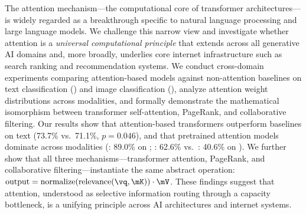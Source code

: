 The attention mechanism---the computational core of transformer architectures---is widely regarded as a breakthrough specific to natural language processing and large language models. We challenge this narrow view and investigate whether attention is a \emph{universal computational principle} that extends across all generative AI domains and, more broadly, underlies core internet infrastructure such as search ranking and recommendation systems. We conduct cross-domain experiments comparing attention-based models against non-attention baselines on text classification (\imdb) and image classification (\cifarten), analyze attention weight distributions across modalities, and formally demonstrate the mathematical isomorphism between transformer self-attention, PageRank, and collaborative filtering. Our results show that attention-based transformers outperform \bilstm baselines on text (73.7\% vs.\ 71.1\%, $p{=}0.046$), and that pretrained attention models dominate across modalities (\distilbert: 89.0\% on \imdb; \vit: 62.6\% vs.\ \resnet: 40.6\% on \cifarten). We further show that all three mechanisms---transformer attention, PageRank, and collaborative filtering---instantiate the same abstract operation: $\text{output} = \text{normalize}(\text{relevance}(\vq, \mK)) \cdot \mV$. These findings suggest that attention, understood as selective information routing through a capacity bottleneck, is a unifying principle across AI architectures and internet systems.
